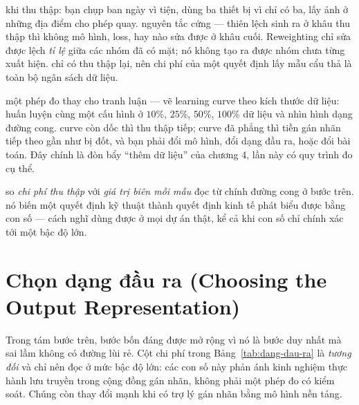 \documentclass[../../deep_learning.tex]{subfiles}
\begin{document}
\begin{mach}
\item {} \gd {} khi thu thập: bạn chụp ban ngày vì tiện, dùng ba thiết bị vì chỉ có ba, lấy ảnh ở những địa điểm cho phép quay. \gp nguyên tắc cứng --- thiên lệch sinh ra ở khâu thu thập thì không mô hình, loss, hay  nào sửa được ở khâu cuối. Reweighting chỉ sửa được lệch \emph{tỉ lệ} giữa các nhóm đã có mặt; nó không tạo ra được nhóm chưa từng xuất hiện. \hq chỉ có thu thập lại, nên chi phí của một quyết định lấy mẫu cẩu thả là toàn bộ ngân sách dữ liệu.
\item {} \gp một phép đo thay cho tranh luận --- vẽ learning curve theo kích thước dữ liệu: huấn luyện cùng một cấu hình ở \(10\%\), \(25\%\), \(50\%\), \(100\%\) dữ liệu và nhìn hình dạng đường cong. \hq curve còn dốc thì thu thập tiếp; curve đã phẳng thì tiền gán nhãn tiếp theo gần như bị đốt, và bạn phải đổi mô hình, đổi dạng đầu ra, hoặc đổi bài toán. Đây chính là đòn bẩy ``thêm dữ liệu'' của chương 4, lần này có quy trình đo cụ thể. 
\item {} \gp so \emph{chi phí thu thập} với \emph{giá trị biên mỗi mẫu} đọc từ chính đường cong ở bước trên. \hq nó biến một quyết định kỹ thuật thành quyết định kinh tế phát biểu được bằng con số --- cách nghĩ dùng được ở mọi dự án thật, kể cả khi con số chỉ chính xác tới một bậc độ lớn.
\end{mach}

\section{Chọn dạng đầu ra (Choosing the Output Representation)}
Trong tám bước trên, bước bốn đáng được mở rộng vì nó là bước duy nhất mà sai lầm không có đường lùi rẻ. Cột chi phí trong Bảng~\ref{tab:dang-dau-ra} là \emph{tương đối} và chỉ nên đọc ở mức bậc độ lớn: các con số này phản ánh kinh nghiệm thực hành lưu truyền trong cộng đồng gán nhãn, không phải một phép đo có kiểm soát. Chúng còn thay đổi mạnh khi có trợ lý gán nhãn bằng mô hình nền tảng.
\end{document}
